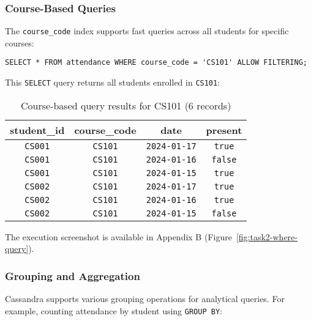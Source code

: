 \subsubsection{Course-Based Queries}
The \texttt{course\_code} index supports fast queries across all students for specific courses:

\begin{verbatim}
SELECT * FROM attendance WHERE course_code = 'CS101' ALLOW FILTERING;
\end{verbatim}

This \texttt{SELECT} query returns all students enrolled in \texttt{CS101}:

\begin{table}[H]
  \centering
  \footnotesize
  \begin{tabular}{|c|c|c|c|}
    \hline
    \textbf{student\_id} & \textbf{course\_code} & \textbf{date} & \textbf{present} \\
    \hline
    \texttt{CS001}                & \texttt{CS101}                 & \texttt{2024-01-17}    & \texttt{true}             \\
    \texttt{CS001}                & \texttt{CS101}                 & \texttt{2024-01-16}    & \texttt{false}            \\
    \texttt{CS001}                & \texttt{CS101}                 & \texttt{2024-01-15}    & \texttt{true}             \\
    \texttt{CS002}                & \texttt{CS101}                 & \texttt{2024-01-17}    & \texttt{true}             \\
    \texttt{CS002}                & \texttt{CS101}                 & \texttt{2024-01-16}    & \texttt{true}             \\
    \texttt{CS002}                & \texttt{CS101}                 & \texttt{2024-01-15}    & \texttt{false}            \\
    \hline
  \end{tabular}
  \caption{Course-based query results for CS101 (6 records)}
\end{table}

The execution screenshot is available in Appendix B (Figure~\ref{fig:task2-where-query}).

\subsubsection{Grouping and Aggregation}
Cassandra supports various grouping operations for analytical queries. For example, counting attendance by student using \texttt{GROUP BY}:

